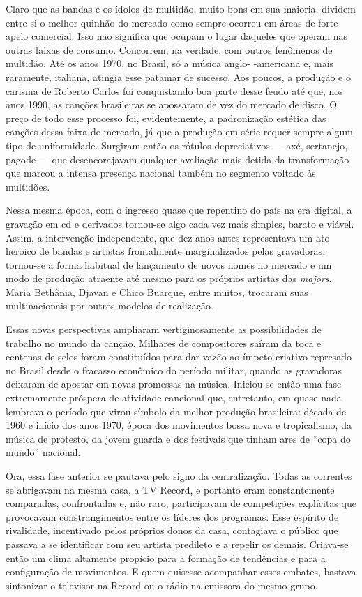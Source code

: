 Claro que as bandas e os ídolos de multidão, muito bons em sua maioria,
dividem entre si o melhor quinhão do mercado como sempre ocorreu em
áreas de forte apelo comercial. Isso não significa que ocupam o lugar
daqueles que operam nas outras faixas de consumo. Concorrem, na verdade,
com outros fenômenos de multidão. Até os anos 1970, no Brasil, só a
música anglo- -americana e, mais raramente, italiana, atingia esse
patamar de sucesso. Aos poucos, a produção e o carisma de Roberto Carlos
foi conquistando boa parte desse feudo até que, nos anos 1990, as
canções brasileiras se apossaram de vez do mercado de disco. O preço de
todo esse processo foi, evidentemente, a padronização estética das
canções dessa faixa de mercado, já que a produção em série requer sempre
algum tipo de uniformidade. Surgiram então os rótulos depreciativos ---
axé, sertanejo, pagode --- que desencorajavam qualquer avaliação mais
detida da transformação que marcou a intensa presença nacional também no
segmento voltado às multidões.

Nessa mesma época, com o ingresso quase que repentino do país na era
digital, a gravação em cd e derivados tornou-se algo cada vez mais
simples, barato e viável. Assim, a intervenção independente, que dez
anos antes representava um ato heroico de bandas e artistas frontalmente
marginalizados pelas gravadoras, tornou-se a forma habitual de
lançamento de novos nomes no mercado e um modo de produção atraente até
mesmo para os próprios artistas das \emph{majors}. Maria Bethânia,
Djavan e Chico Buarque, entre muitos, trocaram suas multinacionais por
outros modelos de realização.~

Essas novas perspectivas ampliaram vertiginosamente as possibilidades de
trabalho no mundo da canção. Milhares de compositores saíram da toca e
centenas de selos foram constituídos para dar vazão ao ímpeto criativo
represado no Brasil desde o fracasso econômico do período militar,
quando as gravadoras deixaram de apostar em novas promessas na música.
Iniciou-se então uma fase extremamente próspera de atividade cancional
que, entretanto, em quase nada lembrava o período que virou símbolo da
melhor produção brasileira: década de 1960 e início dos anos 1970, época
dos movimentos bossa nova e tropicalismo, da música de protesto, da
jovem guarda e dos festivais que tinham ares de ``copa do mundo''
nacional.~

Ora, essa fase anterior se pautava pelo signo da centralização. Todas as
correntes se abrigavam na mesma casa, a TV Record, e portanto eram
constantemente comparadas, confrontadas e, não raro, participavam de
competições explícitas que provocavam constrangimentos entre os líderes
dos programas. Esse espírito de rivalidade, incentivado pelos próprios
donos da casa, contagiava o público que passava a se identificar com seu
artista predileto e a repelir os demais. Criava-se então um clima
altamente propício para a formação de tendências e para a configuração
de movimentos. E quem quisesse acompanhar esses embates, bastava
sintonizar o televisor na Record ou o rádio na emissora do mesmo grupo.~

